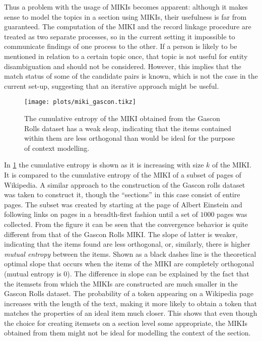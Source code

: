 Thus a problem with the usage of MIKIs becomes apparent: although it makes sense to model the topics in a section using MIKIs, their usefulness is far from guaranteed.
The computation of the MIKI and the record linkage procedure are treated as two separate processes, so in the current setting it impossible to communicate findings of one process to the other.
If a person is likely to be mentioned in relation to a certain topic once, that topic is not useful for entity disambiguation and should not be considered.
However, this implies that the match status of some of the candidate pairs is known, which is not the case in the current set-up, suggesting that an iterative approach might be useful.

\begin{figure}
    \centering
    \texttt{[image: plots/miki\_gascon.tikz]}
    \caption{The cumulative entropy of the MIKI obtained from the Gascon Rolls dataset has a weak sleap, indicating that the items contained within them are less orthogonal than would be ideal for the purpose of context modelling.}
    \label{fig:gascon_convergence}
\end{figure}

In \cref{fig:gascon_convergence} the cumulative entropy is shown as it is increasing with size $k$ of the MIKI.
It is compared to the cumulative entropy of the MIKI of a subset of pages of Wikipedia.
A similar approach to the construction of the Gascon rolls dataset was taken to construct it, though the ``sections'' in this case consist of entire pages.
The subset was created by starting at the page of Albert Einstein and following links on pages in a breadth-first fashion until a set of $1000$ pages was collected.
From the figure it can be seen that the convergence behavior is quite different from that of the Gascon Rolls MIKI.
The slope of latter is weaker, indicating that the items found are less orthogonal, or, similarly, there is higher \emph{mutual entropy} between the items.
Shown as a black dashes line is the theoretical optimal slope that occurs when the items of the MIKI are completely orthogonal (mutual entropy is $0$).
The difference in slope can be explained by the fact that the itemsets from which the MIKIs are constructed are much smaller in the Gascon Rolls dataset.
The probability of a token appearing on a Wikipedia page increases with the length of the text, making it more likely to obtain a token that matches the properties of an ideal item much closer.
This shows that even though the choice for creating itemsets on a section level some appropriate, the MIKIs obtained from them might not be ideal for modelling the context of the section.


